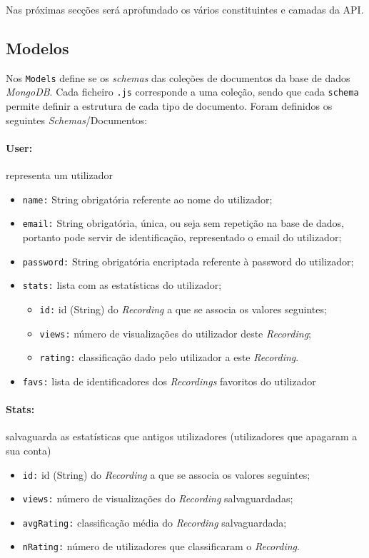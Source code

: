 \documentclass{article}
\begin{document}
Nas próximas secções será aprofundado os vários constituintes e camadas da API.

\subsection{Modelos}

Nos \texttt{Models} define se os \textit{schemas} das coleções de documentos da base de dados \textit{MongoDB}. Cada ficheiro \texttt{.js} corresponde a uma coleção, sendo que cada \texttt{schema} permite definir a estrutura de cada tipo de documento. Foram definidos os seguintes \textit{Schemas}/Documentos:

\paragraph{\textbf{User:}} representa um utilizador
    \begin{itemize}
        \item \texttt{name:} String obrigatória referente ao nome do utilizador;
        \item \texttt{email:} String obrigatória, única, ou seja sem repetição na base de dados, portanto pode servir de identificação, representado o email do utilizador;
        \item \texttt{password:} String obrigatória encriptada referente à password do utilizador;
        \item \texttt{stats:} lista com as estatísticas do utilizador;
            \begin{itemize}
                \item \texttt{id:} id (String) do \textit{Recording} a que se associa os valores seguintes;
                \item \texttt{views:} número de visualizações do utilizador deste \textit{Recording};
                \item \texttt{rating:} classificação dado pelo utilizador a este \textit{Recording}.
            \end{itemize}
        \item \texttt{favs:} lista de identificadores dos \textit{Recordings} favoritos do utilizador
    \end{itemize}

\paragraph{\textbf{Stats:}} salvaguarda as estatísticas que antigos utilizadores (utilizadores que apagaram a sua conta)
    \begin{itemize}
        \item \texttt{id:} id (String) do \textit{Recording} a que se associa os valores seguintes;
        \item \texttt{views:} número de visualizações do \textit{Recording} salvaguardadas;
        \item \texttt{avgRating:} classificação média do \textit{Recording} salvaguardada;
        \item \texttt{nRating:} número de utilizadores que classificaram o \textit{Recording}.
    \end{itemize}
\end{document}
